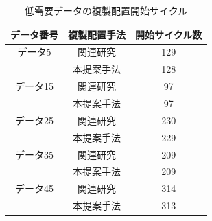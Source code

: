 \documentclass[11pt]{jreport}
\begin{document}
\begin{table}[H]
	\begin{center}
	\caption{低需要データの複製配置開始サイクル}
	\begin{tabular}{ | c | c | c | } \hline
	データ番号 & 複製配置手法 & 開始サイクル数 \\ \hline \hline
	データ5 & 関連研究 & 129 \\ \cline{2-3}
		     & 本提案手法 & 128 \\ \hline
	データ15 & 関連研究 & 97 \\ \cline{2-3}
		     & 本提案手法 & 97 \\ \hline
	データ25 & 関連研究 & 230 \\ \cline{2-3}
		     & 本提案手法 & 229 \\ \hline
	データ35 & 関連研究 & 209 \\ \cline{2-3}
		     & 本提案手法 & 209 \\ \hline
	データ45 & 関連研究 & 314 \\ \cline{2-3}
		     & 本提案手法 & 313 \\ \hline
	\end{tabular}
	\label{tab:counter}
	\end{center}
\end{table}
\end{document}
